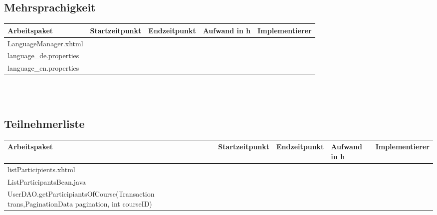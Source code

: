 \begin{landscape}
	\subsection{Mehrsprachigkeit}
	\begin{tabular}{|p{10cm}|p{4cm}|p{3cm}|p{3cm}|p{3cm}|}
		\hline  \textbf{Arbeitspaket} & \textbf{Startzeitpunkt} & \textbf{Endzeitpunkt} & \textbf{Aufwand in h} & \textbf{Implementierer} \\ 
		\hline   LanguageManager.xhtml                                 &                            &                             &                     &\\
		\hline   language\_de.properties                               &                            &                             &                     &\\
		\hline   language\_en.properties                               &                            &                             &                     &\\
		\hline 
	\end{tabular} \ \\
	\ \\
	
	\subsection{Teilnehmerliste}
	\begin{tabular}{|p{10cm}|p{4cm}|p{3cm}|p{3cm}|p{3cm}|}
		\hline  \textbf{Arbeitspaket} & \textbf{Startzeitpunkt} & \textbf{Endzeitpunkt} & \textbf{Aufwand in h} & \textbf{Implementierer} \\ 
		\hline   listParticipients.xhtml                                     &                            &                             &                     &\\
		\hline   ListParticipantsBean.java                                   &                            &                             &                     &\\
		\hline   UserDAO.getParticipiantsOfCourse(Transaction trans,PaginationData pagination, int courseID)  &                            &                             &                     &\\
		\hline 
	\end{tabular} \ \\
	\ \\
	

\end{landscape}
